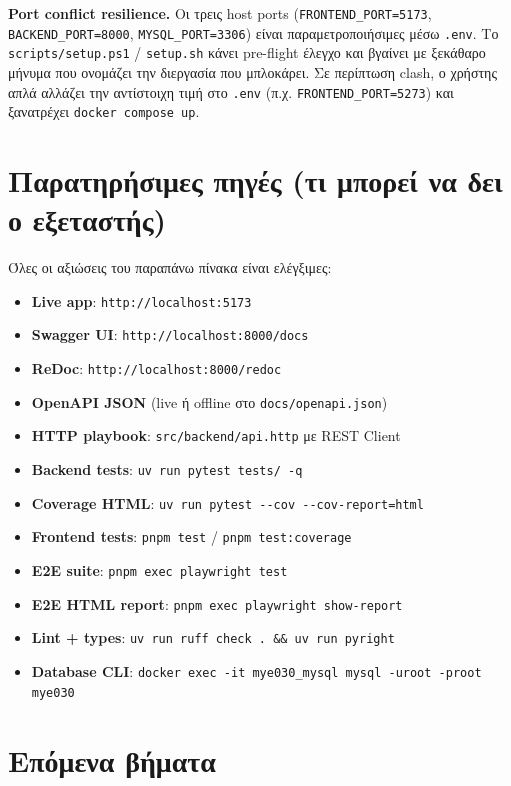 \textbf{Port conflict resilience.} Οι τρεις host ports
(\texttt{FRONTEND\_PORT=5173}, \texttt{BACKEND\_PORT=8000},
\texttt{MYSQL\_PORT=3306}) είναι παραμετροποιήσιμες μέσω
\texttt{.env}. Το \texttt{scripts/setup.ps1} / \texttt{setup.sh}
κάνει pre-flight έλεγχο και βγαίνει με ξεκάθαρο μήνυμα που
ονομάζει την διεργασία που μπλοκάρει. Σε περίπτωση clash, ο
χρήστης απλά αλλάζει την αντίστοιχη τιμή στο \texttt{.env}
(π.χ. \texttt{FRONTEND\_PORT=5273}) και ξανατρέχει
\texttt{docker compose up}.

\section{Παρατηρήσιμες πηγές (τι μπορεί να δει ο εξεταστής)}

Όλες οι αξιώσεις του παραπάνω πίνακα είναι ελέγξιμες:

\begin{itemize}\setlength{\itemsep}{0.2em}
    \item \textbf{Live app}: \texttt{http://localhost:5173}
    \item \textbf{Swagger UI}: \texttt{http://localhost:8000/docs}
    \item \textbf{ReDoc}: \texttt{http://localhost:8000/redoc}
    \item \textbf{OpenAPI JSON} (live ή offline στο \texttt{docs/openapi.json})
    \item \textbf{HTTP playbook}: \texttt{src/backend/api.http} με REST Client
    \item \textbf{Backend tests}: \texttt{uv run pytest tests/ -q}
    \item \textbf{Coverage HTML}: \texttt{uv run pytest -{}-cov -{}-cov-report=html}
    \item \textbf{Frontend tests}: \texttt{pnpm test} / \texttt{pnpm test:coverage}
    \item \textbf{E2E suite}: \texttt{pnpm exec playwright test}
    \item \textbf{E2E HTML report}: \texttt{pnpm exec playwright show-report}
    \item \textbf{Lint + types}: \texttt{uv run ruff check . \&\& uv run pyright}
    \item \textbf{Database CLI}: \texttt{docker exec -it mye030\_mysql mysql -uroot -proot mye030}
\end{itemize}

\section{Επόμενα βήματα}

